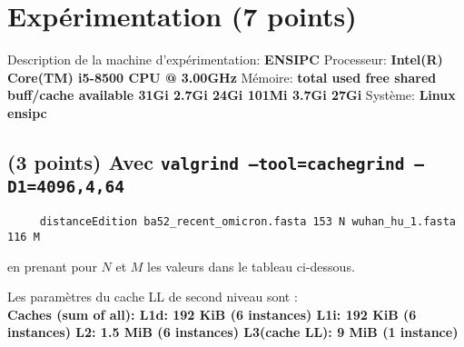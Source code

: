 \documentclass[10pt,a4paper]{article}
\begin{document}
\section{Expérimentation (7 points)}

Description de la machine d'expérimentation: \textbf{ENSIPC}
Processeur: \textbf{Intel(R) Core(TM) i5-8500 CPU @ 3.00GHz}
Mémoire: \textbf{total        used        free      shared  buff/cache   available
          31Gi       2.7Gi        24Gi       101Mi       3.7Gi        27Gi}
Système: \textbf{Linux ensipc}

\subsection{(3 points) Avec {\tt valgrind --tool=cachegrind --D1=4096,4,64}}
\begin{verbatim}
     distanceEdition ba52_recent_omicron.fasta 153 N wuhan_hu_1.fasta 116 M
\end{verbatim}
en prenant pour $N$ et $M$ les valeurs dans le tableau ci-dessous.

Les paramètres du cache LL de second niveau sont :\\ \textbf{Caches (sum of all):     
L1d:                   192 KiB (6 instances)
L1i:                   192 KiB (6 instances)
L2:                    1.5 MiB (6 instances)
L3(cache LL):          9 MiB (1 instance)
}
\end{document}
